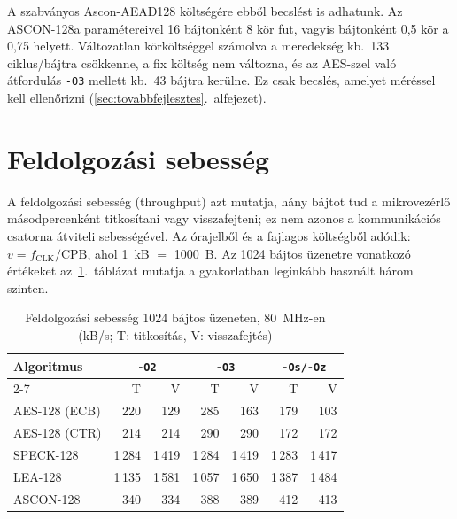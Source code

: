 \documentclass[a4paper,12pt]{report}
\theoremstyle{definition}
\theoremstyle{remark}
\begin{document}
A szabványos Ascon-AEAD128 költségére ebből becslést is adhatunk. Az ASCON-128a paramétereivel 16 bájtonként 8 kör fut, vagyis bájtonként 0,5 kör a 0,75 helyett. Változatlan körköltséggel számolva a meredekség kb.\ 133 ciklus/bájtra csökkenne, a fix költség nem változna, és az AES-szel való átfordulás \texttt{-O3} mellett kb.\ 43 bájtra kerülne. Ez csak becslés, amelyet méréssel kell ellenőrizni (\ref{sec:tovabbfejlesztes}.~alfejezet).

\section{Feldolgozási sebesség}\label{sec:atvitel}

A feldolgozási sebesség (throughput) azt mutatja, hány bájtot tud a mikrovezérlő másodpercenként titkosítani vagy visszafejteni; ez nem azonos a kommunikációs csatorna átviteli sebességével. Az órajelből és a fajlagos költségből adódik: $v = f_{\mathrm{CLK}}/\mathrm{CPB}$, ahol 1~kB $=$ 1000~B. Az 1024 bájtos üzenetre vonatkozó értékeket az~\ref{tab:throughput}.~táblázat mutatja a gyakorlatban leginkább használt három szinten.

\begin{table}[htbp]
    \centering
    \small
    \caption{Feldolgozási sebesség 1024 bájtos üzeneten, 80~MHz-en (kB/s; T: titkosítás, V: visszafejtés)}
    \label{tab:throughput}
    \begin{tabular}{|l|r|r|r|r|r|r|}
        \hline
        \textbf{Algoritmus} & \multicolumn{2}{c|}{\textbf{\texttt{-O2}}} & \multicolumn{2}{c|}{\textbf{\texttt{-O3}}} & \multicolumn{2}{c|}{\textbf{\texttt{-Os/-Oz}}} \\ \cline{2-7}
        & T & V & T & V & T & V \\ \hline
        AES-128 (ECB) & 220    & 129    & 285    & 163    & 179    & 103    \\ \hline
        AES-128 (CTR) & 214    & 214    & 290    & 290    & 172    & 172    \\ \hline
        SPECK-128     & 1\,284 & 1\,419 & 1\,284 & 1\,419 & 1\,283 & 1\,417 \\ \hline
        LEA-128       & 1\,135 & 1\,581 & 1\,057 & 1\,650 & 1\,387 & 1\,484 \\ \hline
        ASCON-128     & 340    & 334    & 388    & 389    & 412    & 413    \\ \hline
    \end{tabular}
\end{table}
\end{document}
